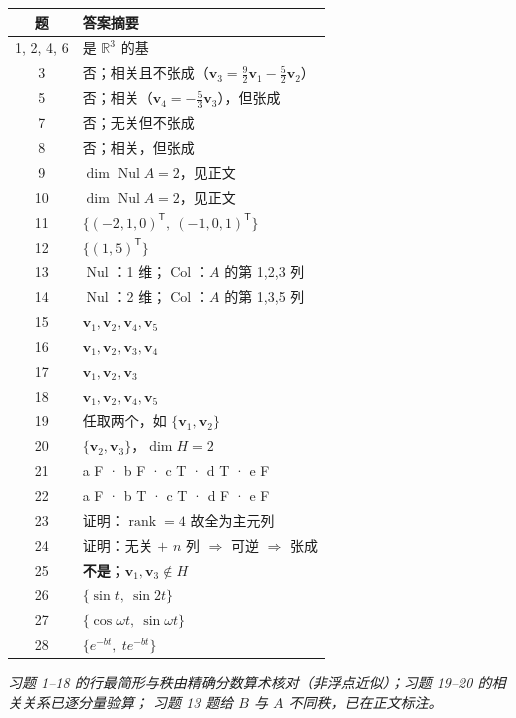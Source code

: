\documentclass[11pt]{ctexart}
\newcommand{\rank}{\operatorname{rank}}
\newcommand{\Nul}{\operatorname{Nul}}
\newcommand{\Col}{\operatorname{Col}}
\newcommand{\R}{\mathbb{R}}
\newcommand{\T}{^{\mathsf T}}
\begin{document}
\begin{center}\small
\begin{tabular}{@{}cl@{}}
\toprule
题 & 答案摘要\\
\midrule
1, 2, 4, 6 & 是 $\R^3$ 的基\\
3 & 否；相关且不张成（$\mathbf v_3=\tfrac92\mathbf v_1-\tfrac52\mathbf v_2$）\\
5 & 否；相关（$\mathbf v_4=-\tfrac53\mathbf v_3$），但张成\\
7 & 否；无关但不张成\\
8 & 否；相关，但张成\\
9 & $\dim\Nul A=2$，见正文\\
10 & $\dim\Nul A=2$，见正文\\
11 & $\{(-2,1,0)\T,\ (-1,0,1)\T\}$\\
12 & $\{(1,5)\T\}$\\
13 & $\Nul$：1 维；$\Col$：$A$ 的第 1,2,3 列\\
14 & $\Nul$：2 维；$\Col$：$A$ 的第 1,3,5 列\\
15 & $\mathbf v_1,\mathbf v_2,\mathbf v_4,\mathbf v_5$\\
16 & $\mathbf v_1,\mathbf v_2,\mathbf v_3,\mathbf v_4$\\
17 & $\mathbf v_1,\mathbf v_2,\mathbf v_3$\\
18 & $\mathbf v_1,\mathbf v_2,\mathbf v_4,\mathbf v_5$\\
19 & 任取两个，如 $\{\mathbf v_1,\mathbf v_2\}$\\
20 & $\{\mathbf v_2,\mathbf v_3\}$，$\dim H=2$\\
21 & a F · b F · c T · d T · e F\\
22 & a F · b T · c T · d F · e F\\
23 & 证明：$\rank=4$ 故全为主元列\\
24 & 证明：无关 $+$ $n$ 列 $\Rightarrow$ 可逆 $\Rightarrow$ 张成\\
25 & \textbf{不是}；$\mathbf v_1,\mathbf v_3\notin H$\\
26 & $\{\sin t,\ \sin2t\}$\\
27 & $\{\cos\omega t,\ \sin\omega t\}$\\
28 & $\{e^{-bt},\ te^{-bt}\}$\\
\bottomrule
\end{tabular}
\end{center}

\vspace{0.3cm}
{\small\textit{习题 1--18 的行最简形与秩由精确分数算术核对（非浮点近似）；习题 19--20 的相关关系已逐分量验算；
习题 13 题给 $B$ 与 $A$ 不同秩，已在正文标注。}}
\end{document}
